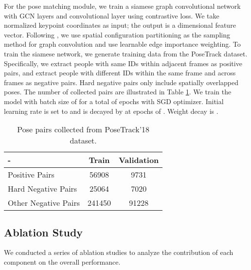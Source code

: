 \documentclass[10pt,twocolumn,letterpaper]{article}
\begin{document}
	For the pose matching module, we train a siamese graph convolutional network with  GCN layers and  convolutional layer using contrastive loss. 
We take normalized keypoint coordinates as input; the output is a  dimensional feature vector. 
	Following \cite{stgcn2018aaai}, we use spatial configuration partitioning as the sampling method for graph convolution and use learnable edge importance weighting. 
	To train the siamese network, we generate training data from the PoseTrack dataset. Specifically, we extract people with same IDs within adjacent frames as positive pairs, and extract people with different IDs within the same frame and across frames as negative pairs. Hard negative pairs only include spatially overlapped poses. 
	The number of collected pairs are illustrated in Table \ref{pose_pairs}.
	We train the model with batch size of  for a total of  epochs with SGD optimizer. Initial learning rate is set to  and is decayed by  at epochs of . Weight decay is .
	\begin{table}[!t]
		\vspace{-1pt}
		\setlength{\tabcolsep}{8pt}
		\small
		\centering 
		\begin{tabular}{l c c}
			\toprule
			-  & Train  & Validation \\
			\midrule
			Positive Pairs         & 56908  & 9731 \\
			Hard Negative Pairs  & 25064  & 7020  \\
			Other Negative Pairs       & 241450  & 91228 \\
			\bottomrule
		\end{tabular}
		\vspace{3pt}
		\caption{Pose pairs collected from PoseTrack'18 dataset. }
		\label{pose_pairs}
		\vspace{-.2in}
	\end{table}
	
	
	\subsection{Ablation Study}
	\label{sec:ablation}
	We conducted a series of ablation studies to analyze the contribution of each component on the overall performance. 
	
\end{document}
